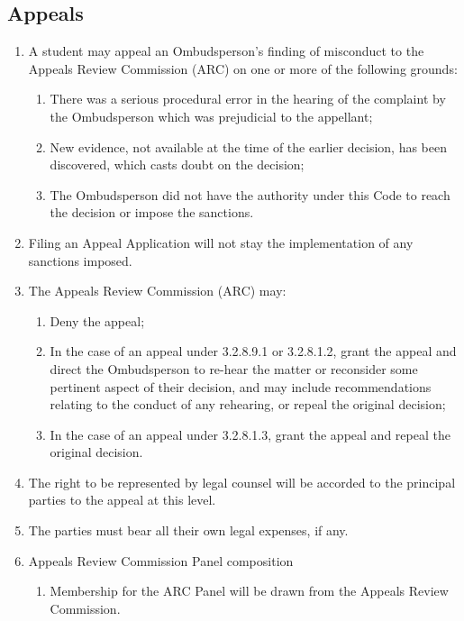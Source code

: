 \subsection{Appeals}
\begin{enumerate} [align=left]
\item A student may appeal an Ombudsperson's finding of misconduct to the Appeals Review Commission (ARC) on one or more of the following grounds:
\begin{enumerate} [label*=\arabic*., align=left]
\item There was a serious procedural error in the hearing of the complaint by the Ombudsperson which was prejudicial to the appellant;
\item New evidence, not available at the time of the earlier decision, has been discovered, which casts doubt on the decision;
\item The Ombudsperson did not have the authority under this Code to reach the decision
or impose the sanctions.
\end{enumerate}
\item Filing an Appeal Application will not stay the implementation of any sanctions imposed. 
\item The Appeals Review Commission (ARC) may:
\begin{enumerate} [label*=\arabic*., align=left]
\item Deny the appeal;
\item In the case of an appeal under 3.2.8.9.1 or 3.2.8.1.2, grant the appeal and direct the Ombudsperson to re-hear the matter or reconsider some pertinent aspect of their decision, and may include recommendations relating to the conduct of any rehearing, or repeal the original decision;
\item In the case of an appeal under 3.2.8.1.3, grant the appeal and repeal the original decision.
\end{enumerate}
\item The right to be represented by legal counsel will be accorded to the principal parties to the appeal at this level.
\item The parties must bear all their own legal expenses, if any.
\item Appeals Review Commission Panel composition
\begin{enumerate} [label*=\arabic*., align=left]
\item Membership for the ARC Panel will be drawn from the Appeals Review Commission.
\end{enumerate}


\end{enumerate}
